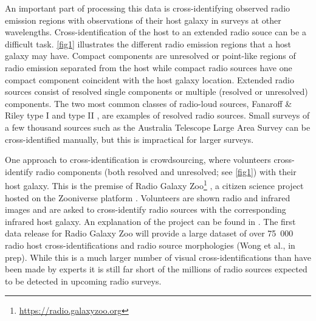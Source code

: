 \documentclass[fleqn,usenatbib,usedcolumn]{mnras}
\begin{document}
  An important part of processing this data is cross-identifying observed
  radio emission regions with observations of their host galaxy in surveys at
  other wavelengths. Cross-identification of the host to an extended radio
  souce can be a difficult task. \autoref{fig1} illustrates the different
  radio emission regions that a host galaxy may have. Compact components are
  unresolved or point-like regions of radio emission separated from the host
  while compact radio sources have one compact component coincident with the
  host galaxy location. Extended radio sources consist of resolved single
  components or multiple (resolved or unresolved) components. The two most
  common classes of radio-loud sources, Fanaroff \& Riley type I and type II
  \citep{Fanaroff1974}, are examples of resolved radio sources. Small surveys
  of a few thousand sources such as the Australia Telescope Large Area Survey
  \citep[ATLAS;][]{norris06,middelberg08} can be cross-identified manually,
  but this is impractical for larger surveys.

  One approach to cross-identification is crowdsourcing, where volunteers
  cross-identify radio components (both resolved and unresolved; see
  \autoref{fig1}) with their host galaxy. This is the premise of Radio Galaxy
  Zoo\footnote{\url{https://radio.galaxyzoo.org}} \citep{banfield15}, a
  citizen science project hosted on the Zooniverse platform \citep{lintott08}.
  Volunteers are shown radio and infrared images and are asked to
  cross-identify radio sources with the corresponding infrared host galaxy. An
  explanation of the project can be found in \citet{banfield15}. The first
  data release for Radio Galaxy Zoo will provide a large dataset of over
  75~000 radio host cross-identifications and radio source morphologies
  (Wong et al., in prep). While this is a much larger number of visual
  cross-identifications than have been made by experts \citep[e.g.,
  ][]{Taylor2007,Gendre2008,Grant2010,norris06,middelberg08} it is still far
  short of the millions of radio sources expected to be detected in upcoming
  radio surveys.
\end{document}
